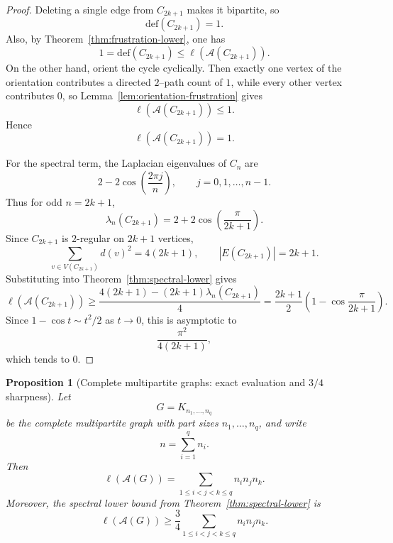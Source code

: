 \documentclass[11pt]{article}
\newtheorem{proposition}{Proposition}
\theoremstyle{plain}
\begin{document}
\begin{proof}
Deleting a single edge from $C_{2k+1}$ makes it bipartite, so
\[
\mathrm{def}(C_{2k+1})=1.
\]
Also, by Theorem~\ref{thm:frustration-lower}, one has
\[
1=\mathrm{def}(C_{2k+1})\le \ell(\mathcal A(C_{2k+1})).
\]
On the other hand, orient the cycle cyclically. Then exactly one vertex of the
orientation contributes a directed $2$--path count of $1$, while every other
vertex contributes $0$, so Lemma~\ref{lem:orientation-frustration} gives
\[
\ell(\mathcal A(C_{2k+1}))\le 1.
\]
Hence
\[
\ell(\mathcal A(C_{2k+1}))=1.
\]

For the spectral term, the Laplacian eigenvalues of $C_n$ are
\[
2-2\cos\left(\frac{2\pi j}{n}\right),\qquad j=0,1,\dots,n-1.
\]
Thus for odd $n=2k+1$,
\[
\lambda_n(C_{2k+1})=2+2\cos\left(\frac{\pi}{2k+1}\right).
\]
Since $C_{2k+1}$ is $2$-regular on $2k+1$ vertices,
\[
\sum_{v\in V(C_{2k+1})} d(v)^2=4(2k+1),
\qquad
|E(C_{2k+1})|=2k+1.
\]
Substituting into Theorem~\ref{thm:spectral-lower} gives
\[
\ell(\mathcal A(C_{2k+1}))
\ge
\frac{4(2k+1)-(2k+1)\lambda_n(C_{2k+1})}{4}
=
\frac{2k+1}{2}\left(1-\cos\frac{\pi}{2k+1}\right).
\]
Since $1-\cos t\sim t^2/2$ as $t\to 0$, this is asymptotic to
\[
\frac{\pi^2}{4(2k+1)},
\]
which tends to $0$.
\end{proof}

\begin{proposition}[Complete multipartite graphs: exact evaluation and $3/4$ sharpness]
\label{prop:complete-multipartite}
Let
\[
G=K_{n_1,\dots,n_q}
\]
be the complete multipartite graph with part sizes $n_1,\dots,n_q$, and write
\[
n=\sum_{i=1}^q n_i.
\]
Then
\[
\ell(\mathcal A(G))
=
\sum_{1\le i<j<k\le q} n_i n_j n_k.
\]
Moreover, the spectral lower bound from Theorem~\ref{thm:spectral-lower} is
\[
\ell(\mathcal A(G))
\ge
\frac34\sum_{1\le i<j<k\le q} n_i n_j n_k.
\]
\end{proposition}
\end{document}
